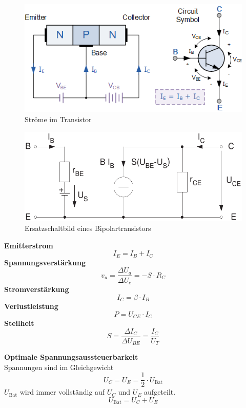 \documentclass[a5paper, 12pt, twoside]{scrartcl}
\begin{document}
\begin{minipage}{.49\linewidth}
  \begin{figure}[H]
    \centering
    \includegraphics[width=\textwidth]{Transistor}
    \caption{Ströme im Transistor}
  \end{figure}
\end{minipage}\hfill\vline\hfill%
\begin{minipage}{.49\linewidth}
  \begin{figure}[H]
    \centering
    \includegraphics[width=\textwidth]{ESBTransistor}
    \caption{Ersatzschaltbild eines Bipolartransistors}
  \end{figure}
\end{minipage}


\textbf{Emitterstrom}
\[I_E = I_B + I_C\]
\textbf{Spannungsverstärkung}
\[v_u = \frac{\Delta U_a}{\Delta U_e} = -S \cdot R_C\]
\textbf{Stromverstärkung}
\[I_C = \beta \cdot I_B\]
\textbf{Verlustleistung}
\[P = U_{CE} \cdot I_C\]
\textbf{Steilheit}
\[S = \frac{\Delta I_C}{\Delta U_{BE}} = \frac{I_C}{U_T}\]

\textbf{Optimale Spannungsaussteuerbarkeit}\\
Spannungen sind im Gleichgewicht
\[U_C = U_E = \frac{1}{2} \cdot U_{\text{Bat}}\]
\(U_{\text{Bat}}\) wird immer vollständig auf \(U_C\) und \(U_E\) aufgeteilt.
\[U_{\text{Bat}} = U_C + U_E\]
\end{document}
